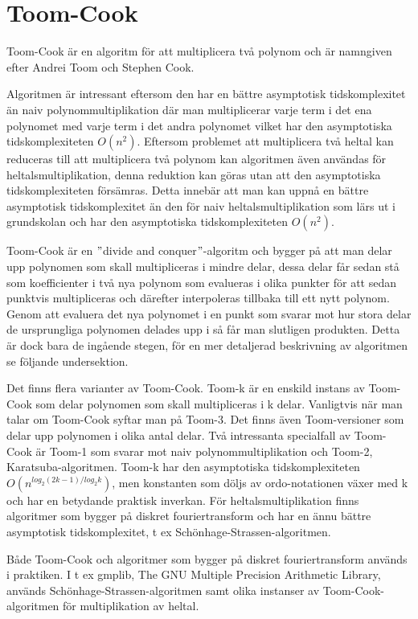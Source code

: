 \section{Toom-Cook}
Toom-Cook är en algoritm för att multiplicera två polynom och är namngiven
efter Andrei Toom och Stephen Cook.

Algoritmen är intressant eftersom den har en bättre asymptotisk tidskomplexitet
än naiv polynommultiplikation där man multiplicerar varje term i det ena
polynomet med varje term i det andra polynomet vilket har den asymptotiska
tidskomplexiteten $O\left(n^2\right)$. Eftersom problemet att multiplicera två
heltal kan reduceras till att multiplicera två polynom kan algoritmen även
användas för heltalsmultiplikation, denna reduktion kan göras utan att den
asymptotiska tidskomplexiteten försämras. Detta innebär att man kan uppnå en
bättre asymptotisk tidskomplexitet än den för naiv heltalsmultiplikation som
lärs ut i grundskolan och har den asymptotiska tidskomplexiteten
$O\left(n^2\right)$.

Toom-Cook är en $"$divide and conquer$"$-algoritm och bygger på att man delar
upp polynomen som skall multipliceras i mindre delar, dessa delar får sedan stå
som koefficienter i två nya polynom som evalueras i olika punkter för att sedan
punktvis multipliceras och därefter interpoleras tillbaka till ett nytt
polynom. Genom att evaluera det nya polynomet i en punkt som svarar mot hur
stora delar de ursprungliga polynomen delades upp i så får man slutligen
produkten. Detta är dock bara de ingående stegen, för en mer detaljerad
beskrivning av algoritmen se följande undersektion.

Det finns flera varianter
av Toom-Cook. Toom-k är en enskild instans av Toom-Cook som delar polynomen som
skall multipliceras i k delar. Vanligtvis när man talar om Toom-Cook syftar man
på Toom-3. Det finns även Toom-versioner som delar upp polynomen i olika antal
delar. Två intressanta specialfall av Toom-Cook är Toom-1 som svarar mot naiv
polynommultiplikation och Toom-2, Karatsuba-algoritmen. Toom-k har den
asymptotiska tidskomplexiteten $O(n^{log_2(2 k-1)/log_2 k})$, men konstanten
som döljs av ordo-notationen växer med k och har en betydande praktisk
inverkan. För heltalsmultiplikation finns algoritmer som bygger på diskret
fouriertransform och har en ännu bättre asymptotisk tidskomplexitet, t ex
Schönhage-Strassen-algoritmen.

Både Toom-Cook och algoritmer som bygger på diskret fouriertransform används i
praktiken. I t ex gmplib, The GNU Multiple Precision Arithmetic Library,
används Schönhage-Strassen-algoritmen samt olika instanser av
Toom-Cook-algoritmen för multiplikation av heltal.

